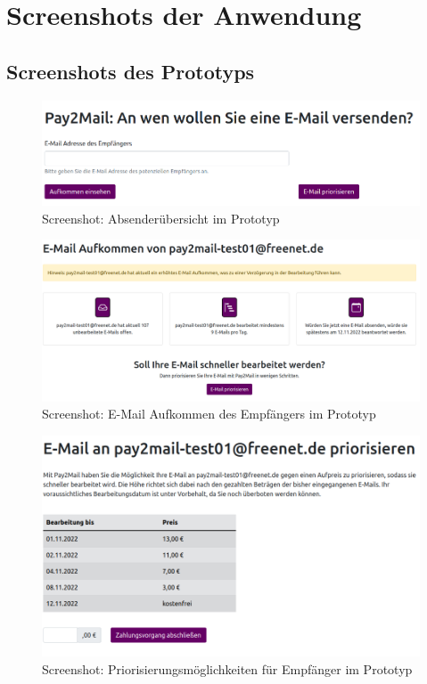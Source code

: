 
\chapter{Screenshots der Anwendung}
\label{Screenshots_der_Anwendung}

\section{Screenshots des Prototyps}

\begin{figure}[!h]
	\centering
		\includegraphics[width=1.2\textwidth]{Figures/send_overview.png}
	\caption{Screenshot: Absenderübersicht im Prototyp}
	\label{fig:screenshot_send/overview}
\end{figure}

\begin{figure}[!h]
	\centering
		\includegraphics[width=1.2\textwidth]{Figures/send_capacity.png}
	\caption{Screenshot: E-Mail Aufkommen des Empfängers im Prototyp}
	\label{fig:screenshot_send/capacity}
\end{figure}

\begin{figure}[!h]
	\centering
		\includegraphics[width=1\textwidth]{Figures/send_priority.png}
	\caption{Screenshot: Priorisierungsmöglichkeiten für Empfänger im Prototyp}
	\label{fig:screenshot_send/priority}
\end{figure}

